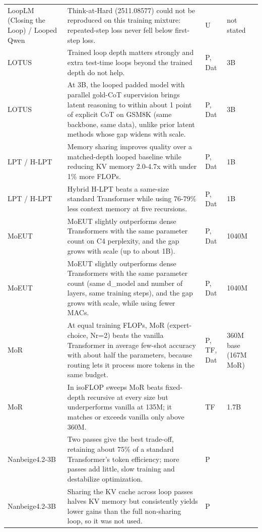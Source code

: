 \begin{longtable}{@{}>{\raggedright\arraybackslash}p{2.7cm}>{\raggedright\arraybackslash}p{7.9cm}>{\raggedright\arraybackslash}p{1.3cm}>{\raggedright\arraybackslash}p{2.5cm}@{}}
LoopLM (Closing the Loop) /\allowbreak{} Looped Qwen~\citep{ax2610.00673} & Think-at-Hard (2511.08577) could not be reproduced on this training mixture: repeated-step loss never fell below first-step loss. & U & not stated \\
LOTUS~\citep{ax2606.31779} & Trained loop depth matters strongly and extra test-time loops beyond the trained depth do not help. & P, Dat & 3B \\
LOTUS~\citep{ax2606.31779} & At 3B, the looped padded model with parallel gold-CoT supervision brings latent reasoning to within about 1 point of explicit CoT on GSM8K (same backbone, same data), unlike prior latent methods whose gap widens with scale. & P, Dat & 3B \\
LPT /\allowbreak{} H-LPT~\citep{ax2610.02383} & Memory sharing improves quality over a matched-depth looped baseline while reducing KV memory 2.0-4.7x with under 1\% more FLOPs. & P, Dat & 1B \\
LPT /\allowbreak{} H-LPT~\citep{ax2610.02383} & Hybrid H-LPT beats a same-size standard Transformer while using 76-79\% less context memory at five recursions. & P, Dat & 1B \\
MoEUT~\citep{ax2405.16039} & MoEUT slightly outperforms dense Transformers with the same parameter count on C4 perplexity, and the gap grows with scale (up to about 1B). & P, Dat & 1040M \\
MoEUT~\citep{ax2405.16039} & MoEUT slightly outperforms dense Transformers with the same parameter count (same d\_model and number of layers, same training steps), and the gap grows with scale, while using fewer MACs. & P, Dat & 1040M \\
MoR~\citep{ax2507.10524} & At equal training FLOPs, MoR (expert-choice, Nr=2) beats the vanilla Transformer in average few-shot accuracy with about half the parameters, because routing lets it process more tokens in the same budget. & P, TF, Dat & 360M base (167M MoR) \\
MoR~\citep{ax2507.10524} & In isoFLOP sweeps MoR beats fixed-depth recursive at every size but underperforms vanilla at 135M; it matches or exceeds vanilla only above 360M. & TF & 1.7B \\
Nanbeige4.2-3B~\citep{ax2607.22083} & Two passes give the best trade-off, retaining about 75\% of a standard Transformer's token efficiency; more passes add little, slow training and destabilize optimization. & P &  \\
Nanbeige4.2-3B~\citep{ax2607.22083} & Sharing the KV cache across loop passes halves KV memory but consistently yields lower gains than the full non-sharing loop, so it was not used. & P &  \\

\end{longtable}
